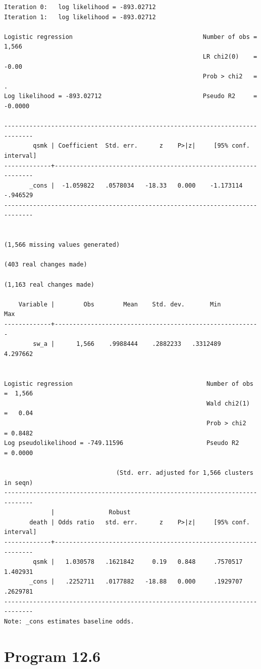 \documentclass[
  10pt,
]{book}
\begin{document}
\begin{verbatim}
Iteration 0:   log likelihood = -893.02712  
Iteration 1:   log likelihood = -893.02712  

Logistic regression                                    Number of obs =   1,566
                                                       LR chi2(0)    =   -0.00
                                                       Prob > chi2   =       .
Log likelihood = -893.02712                            Pseudo R2     = -0.0000

------------------------------------------------------------------------------
        qsmk | Coefficient  Std. err.      z    P>|z|     [95% conf. interval]
-------------+----------------------------------------------------------------
       _cons |  -1.059822   .0578034   -18.33   0.000    -1.173114    -.946529
------------------------------------------------------------------------------


(1,566 missing values generated)

(403 real changes made)

(1,163 real changes made)

    Variable |        Obs        Mean    Std. dev.       Min        Max
-------------+---------------------------------------------------------
        sw_a |      1,566    .9988444    .2882233   .3312489   4.297662


Logistic regression                                     Number of obs =  1,566
                                                        Wald chi2(1)  =   0.04
                                                        Prob > chi2   = 0.8482
Log pseudolikelihood = -749.11596                       Pseudo R2     = 0.0000

                               (Std. err. adjusted for 1,566 clusters in seqn)
------------------------------------------------------------------------------
             |               Robust
       death | Odds ratio   std. err.      z    P>|z|     [95% conf. interval]
-------------+----------------------------------------------------------------
        qsmk |   1.030578   .1621842     0.19   0.848     .7570517    1.402931
       _cons |   .2252711   .0177882   -18.88   0.000     .1929707    .2629781
------------------------------------------------------------------------------
Note: _cons estimates baseline odds.
\end{verbatim}

\hypertarget{program-12.6-1}{%
\section{Program 12.6}\label{program-12.6-1}}
\end{document}
